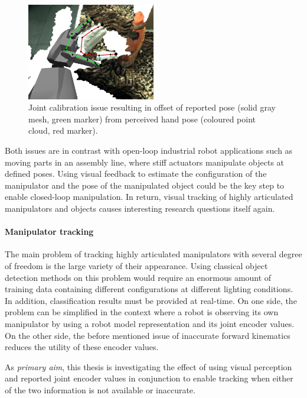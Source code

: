 \begin{figure}
\captionsetup{width=0.6\textwidth}
\centering
\includegraphics[width=0.5\textwidth]{images/valkyrie/joint_calibration_issue.png}
\caption[Joint calibration issue]{Joint calibration issue resulting in offset of reported pose (solid gray mesh, green marker) from perceived hand pose (coloured point cloud, red marker).}
\label{fig:calibration_issue}
\end{figure}

Both issues are in contrast with open-loop industrial robot applications such as moving parts in an assembly line, where stiff actuators manipulate objects at defined poses. Using visual feedback to estimate the configuration of the manipulator and the pose of the manipulated object could be the key step to enable closed-loop manipulation.
In return, visual tracking of highly articulated manipulators and objects causes interesting research questions itself again.

\paragraph{Manipulator tracking}
The main problem of tracking highly articulated manipulators with several degree of freedom is the large variety of their appearance. Using classical object detection methods on this problem would require an enormous amount of training data containing different configurations at different lighting conditions. In addition, classification results must be provided at real-time. On one side, the problem can be simplified in the context where a robot is observing its own manipulator by using a robot model representation and its joint encoder values. On the other side, the before mentioned issue of inaccurate forward kinematics reduces the utility of these encoder values.

As \emph{primary aim}, this thesis is investigating the effect of using visual perception and reported joint encoder values in conjunction to enable tracking when either of the two information is not available or inaccurate.

